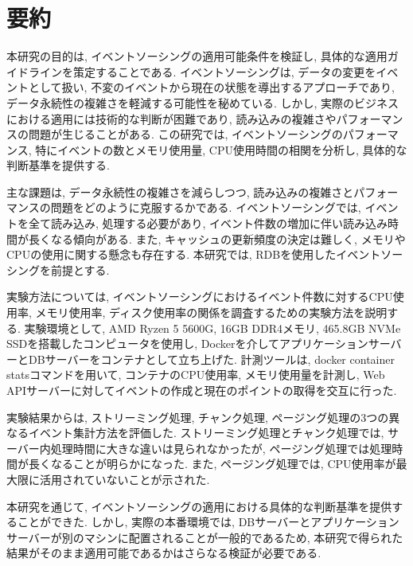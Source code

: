 \documentclass[../../main]{subfiles}
\begin{document}
    \section{要約}\label{sec:phraseology}

    本研究の目的は, イベントソーシングの適用可能条件を検証し, 具体的な適用ガイドラインを策定することである. イベントソーシングは, データの変更をイベントとして扱い, 不変のイベントから現在の状態を導出するアプローチであり, データ永続性の複雑さを軽減する可能性を秘めている. しかし, 実際のビジネスにおける適用には技術的な判断が困難であり, 読み込みの複雑さやパフォーマンスの問題が生じることがある. この研究では, イベントソーシングのパフォーマンス, 特にイベントの数とメモリ使用量, CPU使用時間の相関を分析し, 具体的な判断基準を提供する.

    主な課題は, データ永続性の複雑さを減らしつつ, 読み込みの複雑さとパフォーマンスの問題をどのように克服するかである. イベントソーシングでは, イベントを全て読み込み, 処理する必要があり, イベント件数の増加に伴い読み込み時間が長くなる傾向がある. また, キャッシュの更新頻度の決定は難しく, メモリやCPUの使用に関する懸念も存在する. 本研究では, RDBを使用したイベントソーシングを前提とする.

    実験方法については, イベントソーシングにおけるイベント件数に対するCPU使用率, メモリ使用率, ディスク使用率の関係を調査するための実験方法を説明する. 実験環境として, AMD Ryzen 5 5600G, 16GB DDR4メモリ, 465.8GB NVMe SSDを搭載したコンピュータを使用し, Dockerを介してアプリケーションサーバーとDBサーバーをコンテナとして立ち上げた. 計測ツールは, docker container statsコマンドを用いて, コンテナのCPU使用率, メモリ使用量を計測し, Web APIサーバーに対してイベントの作成と現在のポイントの取得を交互に行った.

    実験結果からは, ストリーミング処理, チャンク処理, ページング処理の3つの異なるイベント集計方法を評価した. ストリーミング処理とチャンク処理では, サーバー内処理時間に大きな違いは見られなかったが, ページング処理では処理時間が長くなることが明らかになった. また, ページング処理では, CPU使用率が最大限に活用されていないことが示された.

    本研究を通じて, イベントソーシングの適用における具体的な判断基準を提供することができた. しかし, 実際の本番環境では, DBサーバーとアプリケーションサーバーが別のマシンに配置されることが一般的であるため, 本研究で得られた結果がそのまま適用可能であるかはさらなる検証が必要である.

    \clearpage
\end{document}

